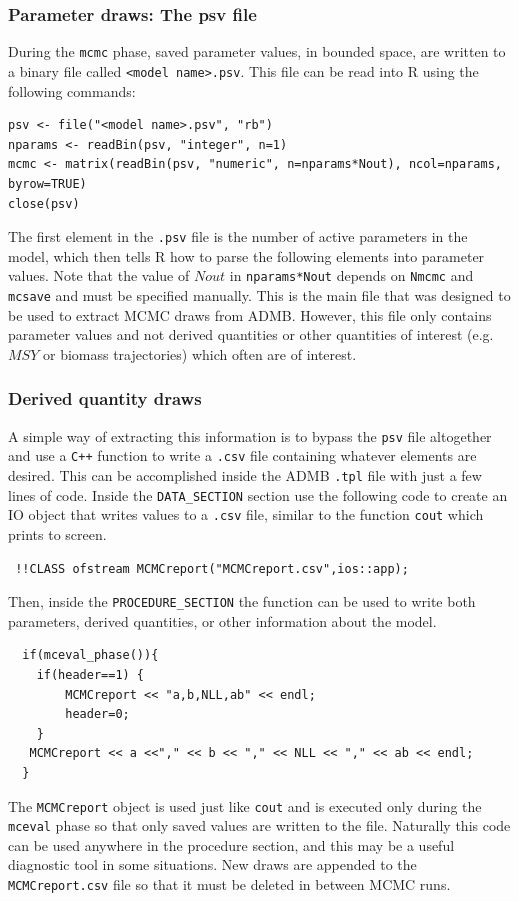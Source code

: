 \documentclass{article}
\begin{document}
\subsubsection{Parameter draws: The psv file}
During the \texttt{mcmc} phase, saved parameter values, in
bounded space, are written to a binary file called
\texttt{<model name>.psv}. This file can be read into R
using the following commands:
\begin{verbatim}
psv <- file("<model name>.psv", "rb") 
nparams <- readBin(psv, "integer", n=1)
mcmc <- matrix(readBin(psv, "numeric", n=nparams*Nout), ncol=nparams, byrow=TRUE)
close(psv)
\end{verbatim}
The first element in the \texttt{.psv} file is the number of
active parameters in the model, which then tells R how to
parse the following elements into parameter values. Note
that the value of $Nout$ in \texttt{nparams*Nout} depends on
\texttt{Nmcmc} and \texttt{mcsave} and must be specified
manually. This is the main file that was designed to be used
to extract MCMC draws from ADMB. However, this file only
contains parameter values and not derived quantities or
other quantities of interest (e.g. $MSY$ or biomass
trajectories) which often are of interest. 
\subsubsection{Derived quantity draws}

A simple way of extracting this information is to bypass the
\texttt{psv} file altogether and use a \texttt{C++} function
to write a \texttt{.csv} file containing whatever elements
are desired. This can be accomplished inside the ADMB
\texttt{.tpl} file with just a few lines of code. Inside the
\texttt{DATA\_SECTION} section use the following code to
create an IO object that writes values to a \texttt{.csv}
file, similar to the function \texttt{cout} which prints to
screen.
\begin{verbatim}
 !!CLASS ofstream MCMCreport("MCMCreport.csv",ios::app);
\end{verbatim}
Then, inside the \texttt{PROCEDURE\_SECTION} the function
can be used to write both parameters, derived quantities, or
other information about the model.
\begin{verbatim}
  if(mceval_phase()){
    if(header==1) {
        MCMCreport << "a,b,NLL,ab" << endl;
        header=0;
    }
   MCMCreport << a <<"," << b << "," << NLL << "," << ab << endl;
  }
\end{verbatim}
The \texttt{MCMCreport} object is used just like
\texttt{cout} and is executed only during the
\texttt{mceval} phase so that only saved values are written
to the file. Naturally this code can be used anywhere in the
procedure section, and this may be a useful diagnostic tool
in some situations. New draws are appended to the
\texttt{MCMCreport.csv} file so that it must be deleted in
between MCMC runs.
\end{document}
